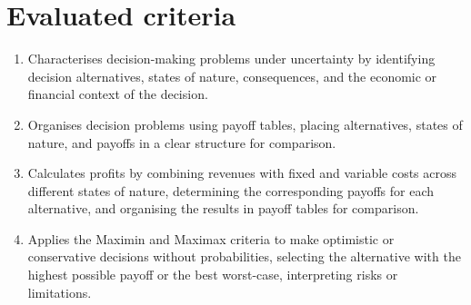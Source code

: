 	\section*{Evaluated criteria}
	\begin{enumerate}[label=\textbf{C\arabic*}]
		\item Characterises decision-making problems under uncertainty by identifying decision alternatives, states of nature, consequences, and the economic or financial context of the decision.
		\item Organises decision problems using payoff tables, placing alternatives, states of nature, and payoffs in a clear structure for comparison.
		\item Calculates profits by combining revenues with fixed and variable costs across different states of nature, determining the corresponding payoffs for each alternative, and organising the results in payoff tables for comparison.
		\item Applies the Maximin and Maximax criteria to make optimistic or conservative decisions without probabilities, selecting the alternative with the highest possible payoff or the best worst-case, interpreting risks or limitations.
	\end{enumerate}
	
